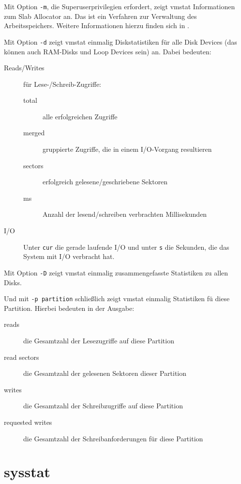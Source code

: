 \begin{normaltext}
  Mit Option \verb?-m?, die Superuserprivilegien erfordert, zeigt vmstat
  Informationen zum Slab Allocator an. Das ist ein Verfahren zur Verwaltung
  des Arbeitsspeichers. Weitere Informationen hierzu finden sich in
  \cite{Bonwick:1994:SAO:1267257.1267263}.

  Mit Option \verb?-d? zeigt vmstat einmalig Diskstatistiken für alle Disk
  Devices (das können auch RAM-Disks und Loop Devices sein) an.
  Dabei bedeuten:
  \begin{description}
    \item[Reads/Writes] für Lese-/Schreib-Zugriffe:
      \begin{description}
        \item[total] alle erfolgreichen Zugriffe
        \item[merged] gruppierte Zugriffe, die in einem I/O-Vorgang resultieren
        \item[sectors] erfolgreich gelesene/geschriebene Sektoren
        \item[ms] Anzahl der lesend/schreiben verbrachten Millisekunden
      \end{description}
    \item[I/O] Unter \verb?cur? die gerade laufende I/O und unter \verb?s? die
      Sekunden, die das System mit I/O verbracht hat.
  \end{description}

  Mit Option \verb?-D? zeigt vmstat einmalig zusammengefasste Statistiken zu
  allen Disks.

  Und mit \verb?-p partition? schließlich zeigt vmstat einmalig Statistiken fü
  diese Partition. Hierbei bedeuten in der Ausgabe:
  \begin{description}
    \item[reads] die Gesamtzahl der Lesezugriffe auf diese Partition
    \item[read sectors] die Gesamtzahl der gelesenen Sektoren dieser Partition
    \item[writes] die Gesamtzahl der Schreibzugriffe auf diese Partition
    \item[requested writes] die Gesamtzahl der Schreibanforderungen für diese
      Partition
  \end{description}
\end{normaltext}

\section{sysstat}
\label{sec:lokal-werkzeuge-sysstat}

